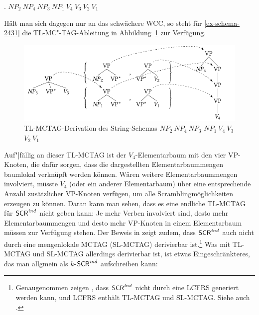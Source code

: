 \ex. $\mathit{NP}_2 ~ \mathit{NP}_4 ~ \mathit{NP}_3 ~ \mathit{NP}_1 ~ V_4 ~ V_3 ~ V_2 ~ V_1$\label{ex-schema-2431}

Hält man sich dagegen nur an das schwächere WCC, so steht für \ref{ex-schema-2431} die TL-MC"-TAG-Ableitung in Abbildung~\ref{fig-schema-2431} zur Verfügung.
\begin{figure}[t]
\centering
\includegraphics{graphics/abb516.pdf}
\caption{\label{fig-schema-2431}TL-MCTAG-Derivation des String-Schemas $\mathit{NP}_2 ~ \mathit{NP}_4 ~ \mathit{NP}_3$ $\mathit{NP}_1 ~ V_4 ~ V_3$ $V_2 ~ V_1$}
\end{figure}
Auf"|fällig an dieser TL-MCTAG ist der $V_4$-Ele\-men\-tarbaum mit den vier VP-Knoten, die dafür sorgen, dass die dargestellten Elementarbaummengen baumlokal verknüpft werden können. Wären weitere Elementarbaummengen involviert, müsste $V_4$ (oder ein anderer Elementarbaum) über eine entsprechende Anzahl zusätzlicher VP-Knoten verfügen, um alle Scramblingmöglichkeiten erzeugen zu können. Daran kann man sehen, dass es eine endliche TL-MCTAG für $\mathsf{SCR}^{\mathit{ind}}$ nicht geben kann: Je mehr Verben involviert sind, desto mehr Elementarbaummengen und desto mehr VP-Knoten in einem Elementarbaum müssen zur Verfügung stehen. Der Beweis in \cite{Becker:Rambow:Niv:92} zeigt zudem, dass $\mathsf{SCR}^{\mathit{ind}}$ auch nicht durch eine mengenlokale MCTAG (SL-MCTAG) derivierbar ist.\footnote{\label{fn-lcfrs} Genaugenommen zeigen \cite{Becker:Rambow:Niv:92}, dass $\mathsf{SCR}^{\mathit{ind}}$ nicht durch eine LCFRS generiert werden kann, und LCFRS enthält TL-MCTAG und SL-MCTAG. Siehe auch \citet[53ff]{Rambow:94}.} Was mit TL-MCTAG und SL-MCTAG allerdings derivierbar ist, ist etwas Eingeschränkteres, das man allgmein als $k$-$\mathsf{SCR}^{\mathit{ind}}$ aufschreiben kann:

